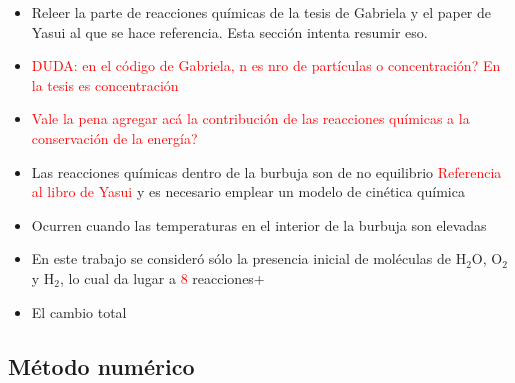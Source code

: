 \documentclass[aps,prb,twocolumn,superscriptaddress,floatfix,longbibliography,10pt]{revtex4-2}
\begin{document}
\begin{itemize}
  \item Releer la parte de reacciones químicas de la tesis de Gabriela y el paper de Yasui al que se hace referencia. Esta sección intenta resumir eso.
  \item \textcolor{red}{DUDA: en el código de Gabriela, n es nro de partículas o concentración? En la tesis es concentración}
  \item \textcolor{red}{Vale la pena agregar acá la contribución de las reacciones químicas a la conservación de la energía?}
\end{itemize}


\begin{itemize}
  \item Las reacciones químicas dentro de la burbuja son de no equilibrio \textcolor{red}{Referencia al libro de Yasui} y es necesario emplear un modelo de cinética química
  \item Ocurren cuando las temperaturas en el interior de la burbuja son elevadas
  \item En este trabajo se consideró sólo la presencia inicial de moléculas de $\mathrm{H_2O}$, $\mathrm{O_2}$ y $\mathrm{H_2}$, lo cual da lugar a \textcolor{red}{8} reacciones+
  \item El cambio total 

\end{itemize}


\subsection{Método numérico}
\end{document}
